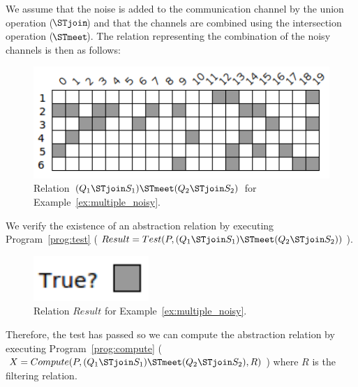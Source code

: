 \begin{example}
	We assume that the noise is added to the communication channel by the union operation ( $\!\!\!\STjoin\!\!\!$ ) and that the channels are combined using the intersection operation ( $\!\!\!\STmeet\!\!\!$ ). The relation representing the combination of the noisy channels is then as follows: \newline

	\begin{figure}[ht]
		\centering
		\includegraphics[scale=0.65]{Figures/PDF/Relview/NoiseCombine.pdf}
		\caption{Relation $(Q_1 \STjoin S_1) \STmeet (Q_2 \STjoin S_2)$ for Example~\ref{ex:multiple_noisy}.}
		\label{fig:multiple_noisy_combine}
	\end{figure}	

	We verify the existence of an abstraction relation by executing Program~\ref{prog:test} ($Result = Test(P, (Q_1 \STjoin S_1) \STmeet (Q_2 \STjoin S_2))$). \newline

	\begin{figure}[ht]
		\centering
		\includegraphics[scale=0.65]{Figures/PDF/Relview/True.pdf}
		\caption{Relation $Result$ for Example~\ref{ex:multiple_noisy}.}
		\label{fig:multiple_noisy_result}
	\end{figure}

	Therefore, the test has passed so we can compute the abstraction relation by executing Program~\ref{prog:compute} ($X = Compute(P,(Q_1 \STjoin S_1) \STmeet (Q_2 \STjoin S_2),R)$) where $R$ is the filtering relation. \newline


\end{example}
